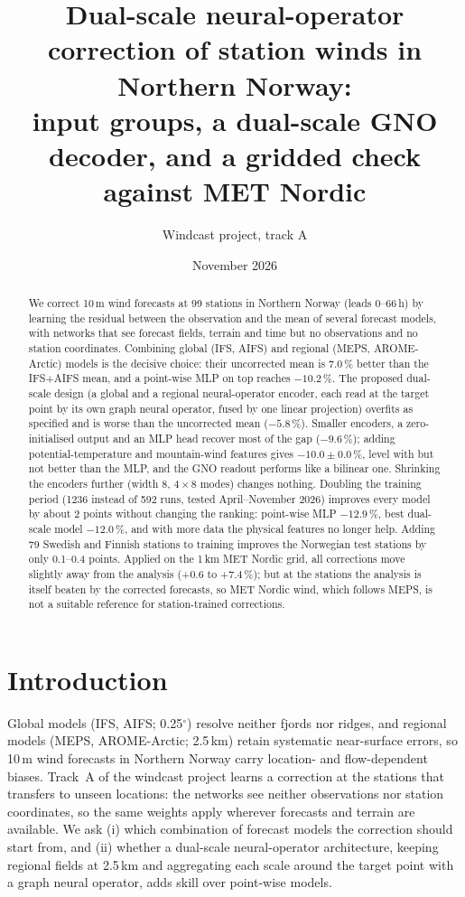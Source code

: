 \documentclass[10pt,a4paper]{article}
\title{Dual-scale neural-operator correction of station winds in Northern Norway:\\
input groups, a dual-scale GNO decoder, and a gridded check against MET Nordic}
\author{Windcast project, track A}
\date{November 2026}
\begin{document}
\maketitle

\begin{abstract}
We correct 10\,m wind forecasts at 99 stations in Northern Norway (leads 0--66\,h) by learning the
residual between the observation and the mean of several forecast models, with networks that see
forecast fields, terrain and time but no observations and no station coordinates. Combining global
(IFS, AIFS) and regional (MEPS, AROME-Arctic) models is the decisive choice: their uncorrected mean is
7.0\,\% better than the IFS+AIFS mean, and a point-wise MLP on top reaches $-10.2$\,\%. The proposed
dual-scale design (a global and a regional neural-operator encoder, each read at the target point by
its own graph neural operator, fused by one linear projection) overfits as specified and is worse
than the uncorrected mean ($-5.8$\,\%). Smaller encoders, a zero-initialised output and an MLP head
recover most of the gap ($-9.6$\,\%); adding potential-temperature and mountain-wind features gives
$-10.0\pm0.0$\,\%, level with but not better than the MLP, and the GNO readout performs like a
bilinear one. Shrinking the encoders further (width 8, $4\times8$ modes) changes nothing. Doubling the
training period (1236 instead of 592 runs, tested April--November 2026) improves every model by about
2 points without changing the ranking: point-wise MLP $-12.9$\,\%, best dual-scale model $-12.0$\,\%,
and with more data the physical features no longer help. Adding 79 Swedish and Finnish stations to
training improves the Norwegian test stations by only 0.1--0.4 points. Applied on the 1\,km MET Nordic grid, all corrections move slightly away from the
analysis (+0.6 to +7.4\,\%); but at the stations the analysis is itself beaten by the corrected
forecasts, so MET Nordic wind, which follows MEPS, is not a suitable reference for station-trained
corrections.
\end{abstract}

\section{Introduction}
Global models (IFS, AIFS; 0.25$^\circ$) resolve neither fjords nor ridges, and regional models
(MEPS, AROME-Arctic; 2.5\,km) retain systematic near-surface errors, so 10\,m wind forecasts in
Northern Norway carry location- and flow-dependent biases. Track~A of the windcast project learns a
correction at the stations that transfers to unseen locations: the networks see neither observations
nor station coordinates, so the same weights apply wherever forecasts and terrain are available. We
ask (i) which combination of forecast models the correction should start from, and (ii) whether a
dual-scale neural-operator architecture, keeping regional fields at 2.5\,km and aggregating each scale
around the target point with a graph neural operator, adds skill over point-wise models.
\end{document}
